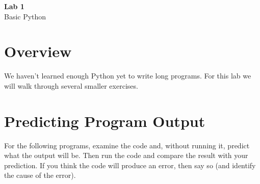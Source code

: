 \documentclass{article}
\begin{document}
\fancyfoot[C]{\thepage}
\vspace*{0cm}
\begin{center}
	{\LARGE \textbf{Lab 1}}\\
	\vspace{.25cm}
	{\Large Basic Python}
\end{center}

\section*{Overview}
We haven't learned enough Python yet to write long programs. For this lab we will walk through several smaller exercises.

\section*{Predicting Program Output}
For the following programs, examine the code and, without running it, predict what the output will be. Then run the code and compare the result with your prediction. If you think the code will produce an error, then say so (and identify the cause of the error).
\end{document}
